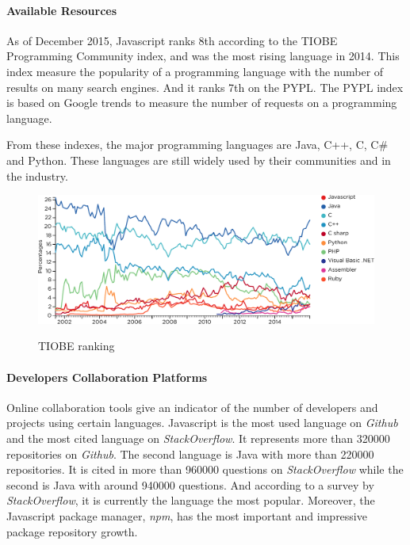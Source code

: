 \paragraph{Available Resources}

As of December 2015, Javascript ranks 8th according to the TIOBE Programming Community index, and was the most rising language in 2014.
This index measure the popularity of a programming language with the number of results on many search engines.
And it ranks 7th on the PYPL.
The PYPL index is based on Google trends to measure the number of requests on a programming language.

From these indexes, the major programming languages are Java, C++, C, C\# and Python.
These languages are still widely used by their communities and in the industry.

\begin{figure}[h!]
  \centering
  \includegraphics[width=\linewidth]{../resources/tiobe.pdf}
  \label{fig:tiobe}
  \caption{TIOBE ranking}
\end{figure}

\paragraph{Developers Collaboration Platforms}

Online collaboration tools give an indicator of the number of developers and projects using certain languages.
Javascript is the most used language on \textit{Github} and the most cited language on \textit{StackOverflow}.
It represents more than \num{320000} repositories on \textit{Github}.
The second language is Java with more than \num{220000} repositories.
It is cited in more than \num{960000} questions on \textit{StackOverflow} while the second is Java with around \num{940000} questions.
And according to a survey by \textit{StackOverflow}, it is currently the language the most popular.
Moreover, the Javascript package manager, \textit{npm}, has the most important and impressive package repository growth.


